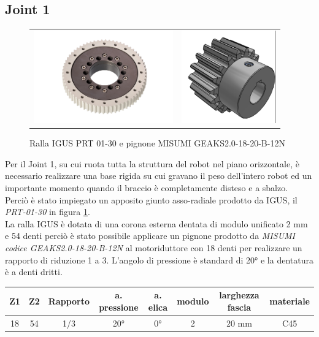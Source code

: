 \documentclass[%
corpo=11pt,
twoside,
 stile=classica,
oldstyle,
greek,%
]{toptesi}
\begin{document}
		\subsection{Joint 1}
		\begin{figure}
			\centering
			\begin{tabular}{ll}
				\includegraphics[height=4cm,keepaspectratio]{pictures/ralla.jpg}
				&
				\includegraphics[height=4cm,keepaspectratio]{pictures/pignone.png}
			\end{tabular}
			\caption{Ralla IGUS PRT 01-30 e pignone MISUMI GEAKS2.0-18-20-B-12N}
			\label{fig:RALLA}
		\end{figure}
		Per il Joint 1, su cui ruota tutta la struttura del robot nel piano orizzontale, è necessario realizzare una base rigida su cui gravano il peso dell'intero robot ed un importante momento quando il braccio è completamente disteso e a sbalzo.\\
		 Perciò è stato impiegato un apposito giunto asso-radiale prodotto da IGUS, il \textit{PRT-01-30} in figura \ref{fig:RALLA}. \\
		La ralla IGUS è dotata di una corona esterna dentata di modulo unificato 2 mm e 54 denti perciò è stato possibile applicare un pignone prodotto da \textit{MISUMI codice GEAKS2.0-18-20-B-12N} al motoriduttore con 18 denti per realizzare un rapporto di riduzione 1 a 3. L'angolo di pressione è standard di 20° e la dentatura è a denti dritti. 
		\\
		\begin{tabular}{|c|c|c|c|c|c|c|c|}
			
			\hline
			Z1 & Z2 & Rapporto & a. pressione & a. elica & modulo & larghezza fascia & materiale \\
			\hline
			18 & 54 & 1/3 & 20° & 0°  & 2 & 20 mm & C45  \\
			\hline
			
		\end{tabular}
\end{document}
